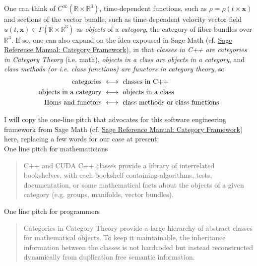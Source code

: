 \documentclass[10pt, landscape]{amsart}
\begin{document}
One can think of $C^{\infty}(\mathbb{R}\times \mathbb{R}^3)$, time-dependent functions, such as $\rho = \rho(t\times \mathbf{x})$ and sections of the vector bundle, such as time-dependent velocity vector field $u(t,\mathbf{x}) \in \Gamma(\mathbb{R}\times \mathbb{R}^3)$ as \emph{objects} of a \emph{category}, the category of fiber bundles over $\mathbb{R}^3$.  If so, one can also expand on the idea expoused in Sage Math (cf. \href{http://doc.sagemath.org/pdf/en/reference/categories/categories.pdf}{Sage Reference Manual: Category Framework}), in that \emph{classes in C++ are categories in Category Theory} (i.e. math), \emph{objects in a class are objects in a category}, and \emph{class methods (or i.e. class functions) are functors in category theory}, so
\[
\begin{aligned}
  \text{ categories } & \longleftrightarrow  \text{ classes in C++ }  \\
  \text{ objects in a category } & \longleftrightarrow \text{ objects in a class } \\
  \text{ \text{Hom}s and functors } & \longleftrightarrow \text{ class methods or class functions }
\end{aligned}
\]

I will copy the one-line pitch that advocates for this software engineering framework from Sage Math (cf. \href{http://doc.sagemath.org/pdf/en/reference/categories/categories.pdf}{Sage Reference Manual: Category Framework}) here, replacing a few words for our case at present: \\

  One line pitch for mathematicians \\

\begin{quote} C++ and CUDA C++ classes provide a library of interrelated bookshelves, with each bookshelf containing algorithms,  tests, documentation, or some mathematical facts about the objects of a given category (e.g. groups, manifolds, vector bundles). \end{quote} 

One line pitch for programmers  \\

\begin{quote} Categories in Category Theory provide a large hierarchy of abstract classes for mathematical objects. To keep it maintainable, the inheritance information between the classes is not hardcoded but instead reconstructed dynamically from duplication free semantic information. \end{quote} 
\end{document}
